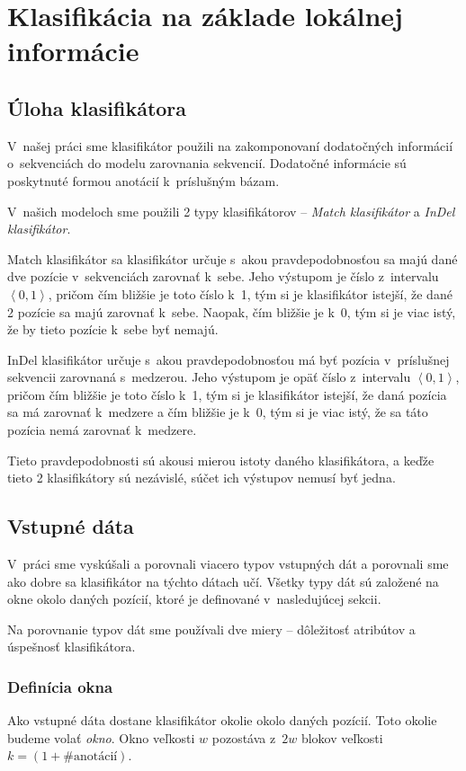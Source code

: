 \chapter[Klasifikácia]{Klasifikácia na základe lokálnej informácie}

\section{Úloha klasifikátora}

V~našej práci sme klasifikátor použili na zakomponovaní dodatočných informácií o~sekvenciách do modelu zarovnania sekvencií. Dodatočné informácie sú poskytnuté formou anotácií k~príslušným bázam.

V~našich modeloch sme použili 2 typy klasifikátorov -- \textit{Match klasifikátor} a \textit{InDel klasifikátor}.

Match klasifikátor sa klasifikátor určuje s~akou pravdepodobnosťou sa majú dané dve pozície v~sekvenciách zarovnať k~sebe. Jeho výstupom je číslo z~intervalu $\left<0,1\right>$, pričom čím bližšie je toto číslo k~1, tým si je klasifikátor istejší, že dané 2 pozície sa majú zarovnať k~sebe. Naopak, čím bližšie je k~0, tým si je viac istý, že by tieto pozície k~sebe byť nemajú.

InDel klasifikátor určuje s~akou pravdepodobnosťou má byť pozícia v~príslušnej sekvencii zarovnaná s~medzerou. Jeho výstupom je opäť  číslo z~intervalu $\left<0,1\right>$, pričom čím bližšie je toto číslo k~1, tým si je klasifikátor istejší, že daná pozícia sa má zarovnať k~medzere a čím bližšie je k~0, tým si je viac istý, že sa táto pozícia nemá zarovnať k~medzere.

Tieto pravdepodobnosti sú akousi mierou istoty daného klasifikátora, a keďže tieto 2 klasifikátory sú nezávislé, súčet ich výstupov nemusí byť jedna.

\section{Vstupné dáta}

V~práci sme vyskúšali a porovnali viacero typov vstupných dát a porovnali sme ako dobre sa klasifikátor na týchto dátach učí. Všetky typy dát sú založené na okne okolo daných pozícií, ktoré je definované v~nasledujúcej sekcii.

Na porovnanie typov dát sme používali dve miery -- dôležitosť atribútov a úspešnosť klasifikátora.

\subsection{Definícia okna}
\label{subsec:window}
Ako vstupné dáta dostane klasifikátor okolie okolo daných pozícií. Toto okolie budeme volať \textit{okno}. Okno veľkosti $w$ pozostáva z~$2w$ blokov veľkosti $k = (1+\#\text{anotácií})$.

